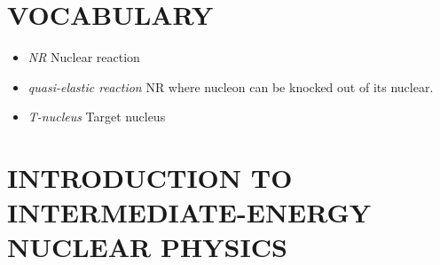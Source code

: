 \def \AATOS {/home/miheikki/public/html/}
\def \PIC {/afs/cern.ch/user/m/miheikki/public/html/inucl/doc/}
\def \PIC {/home/miheikki/public/html/inucl/doc/}



  
%


\section{VOCABULARY}
\begin{itemize}
\item {\it NR} Nuclear reaction
\item {\it quasi-elastic reaction} NR where nucleon can be knocked out of its nuclear. 
\item {\it T-nucleus} Target nucleus 
\end{itemize}

\section{INTRODUCTION TO INTERMEDIATE-ENERGY NUCLEAR PHYSICS}


